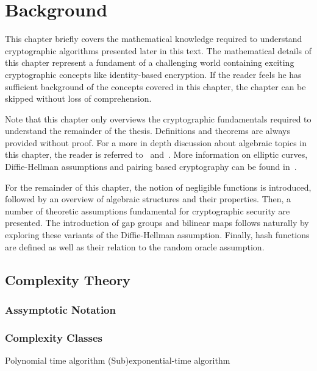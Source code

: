 \chapter{Background}
\label{cha:1}
This chapter briefly covers the mathematical knowledge required to understand cryptographic algorithms presented later in this text. The mathematical details of this chapter represent a fundament of a challenging world containing exciting cryptographic concepts like identity-based encryption. If the reader feels he has sufficient background of the concepts covered in this chapter, the chapter can be skipped without loss of comprehension.

Note that this chapter only overviews the cryptographic fundamentals required to understand the remainder of the thesis. Definitions and theorems are always provided without proof. For a more in depth discussion about algebraic topics in this chapter, the reader is referred to~\cite{book:handbook_of_applied_cryptography} and~\cite{book:survey_of_modern_algebra}. More information on elliptic curves, Diffie-Hellman assumptions and pairing based cryptography can be found in~\cite{thesis:Maas04}.

For the remainder of this chapter, the notion of negligible functions is introduced, followed by an overview of algebraic structures and their properties. Then, a number of theoretic assumptions fundamental for cryptographic security are presented. The introduction of gap groups and bilinear maps follows naturally by exploring these variants of the Diffie-Hellman assumption. Finally, hash functions are defined as well as their relation to the random oracle assumption.

\section{Complexity Theory}
\subsection{Assymptotic Notation}

\subsection{Complexity Classes}
Polynomial time algorithm
(Sub)exponential-time algorithm

